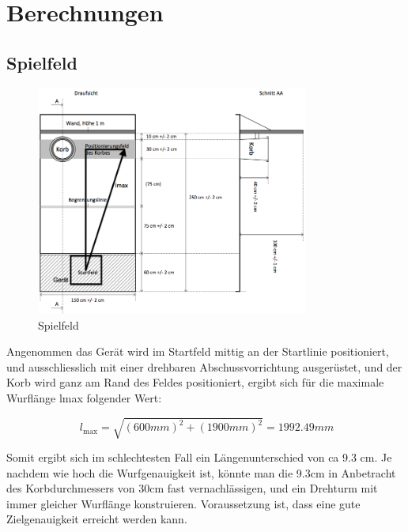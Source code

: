 \section{Berechnungen}

\subsection{Spielfeld}
\begin{figure}[h!]          
    \centering             
    \includegraphics[width=0.8\textwidth]{fig/Bild_Spielfeld.png}    
    \caption{Spielfeld}
    
    \label{fig:bild}        %
\end{figure}
\noindent
Angenommen das Gerät wird im Startfeld mittig an der Startlinie positioniert, 
und ausschliesslich mit einer drehbaren Abschussvorrichtung ausgerüstet, und 
der Korb wird ganz am Rand des Feldes positioniert, ergibt sich für die 
maximale Wurflänge lmax folgender Wert: 

\[\ l_\text{max} = \sqrt{(600mm)^2 + (1900mm)^2} = 1992.49mm \]

Somit ergibt sich im schlechtesten Fall ein Längenunterschied von ca 9.3 cm. 
Je nachdem wie hoch die Wurfgenauigkeit ist, könnte man die 9.3cm in 
Anbetracht des Korbdurchmessers von 30cm fast vernachlässigen, und ein 
Drehturm mit immer gleicher Wurflänge konstruieren. Voraussetzung ist, dass 
eine gute Zielgenauigkeit erreicht werden kann.

